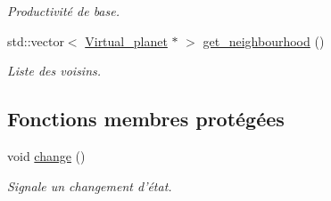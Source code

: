 \begin{DoxyCompactItemize}
\begin{DoxyCompactList}\small\item\em Productivité de base. \end{DoxyCompactList}\item 
\hypertarget{classVirtual__planet_a996699dcad7e99262842e06079896ed1}{std\-::vector$<$ \hyperlink{classVirtual__planet}{Virtual\-\_\-planet} $\ast$ $>$ \hyperlink{classVirtual__planet_a996699dcad7e99262842e06079896ed1}{get\-\_\-neighbourhood} ()}\label{classVirtual__planet_a996699dcad7e99262842e06079896ed1}

\begin{DoxyCompactList}\small\item\em Liste des voisins. \end{DoxyCompactList}\end{DoxyCompactItemize}
\subsection*{Fonctions membres protégées}
\begin{DoxyCompactItemize}
\item 
\hypertarget{classVirtual__planet_a9c79d42a13bb25243354faf9895aca14}{void \hyperlink{classVirtual__planet_a9c79d42a13bb25243354faf9895aca14}{change} ()}\label{classVirtual__planet_a9c79d42a13bb25243354faf9895aca14}

\begin{DoxyCompactList}\small\item\em Signale un changement d'état. \end{DoxyCompactList}\end{DoxyCompactItemize}
